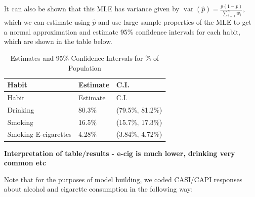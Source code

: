 \documentclass[
  11pt,
]{article}
\begin{document}
It can also be shown that this MLE has variance given by
\(\mathop{\mathrm{var}}(\widehat{p})=\frac{p(1-p)}{\sum_{i=1}^{n}w_i}\),
which we can estimate using \(\widehat{p}\) and use large sample
properties of the MLE to get a normal approximation and estimate 95\%
confidence intervals for each habit, which are shown in the table below.

\begin{longtable}[]{@{}lll@{}}
\caption{Estimates and 95\% Confidence Intervals for \% of
Population}\tabularnewline
\toprule()
Habit & Estimate & C.I. \\
\midrule()
\endfirsthead
\toprule()
Habit & Estimate & C.I. \\
\midrule()
\endhead
Drinking & 80.3\% & (79.5\%, 81.2\%) \\
Smoking & 16.5\% & (15.7\%, 17.3\%) \\
Smoking E-cigarettes & 4.28\% & (3.84\%, 4.72\%) \\
\bottomrule()
\end{longtable}

\textbf{Interpretation of table/results - e-cig is much lower, drinking
very common etc}

Note that for the purposes of model building, we coded CASI/CAPI
responses about alcohol and cigarette consumption in the following way:
\end{document}
